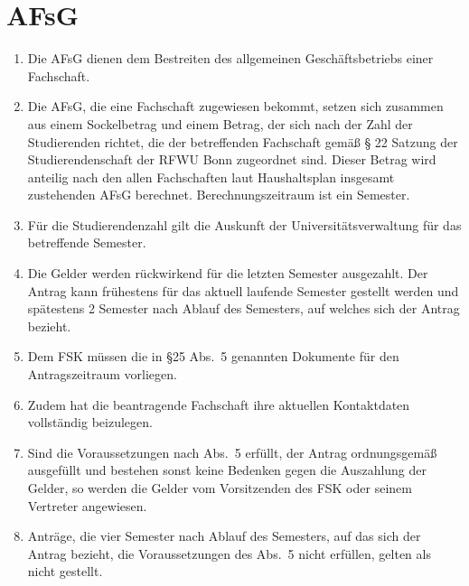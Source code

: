 \documentclass{article}
\begin{document}
\section{AFsG}
\begin{enumerate}[(1)]
    \item Die AFsG dienen dem Bestreiten des allgemeinen Geschäftsbetriebs einer Fachschaft.
    \item Die AFsG, die eine Fachschaft zugewiesen bekommt, setzen sich zusammen aus einem Sockelbetrag und einem Betrag, der sich nach der Zahl der Studierenden richtet, die der betreffenden Fachschaft gemäß § 22 Satzung der Studierendenschaft der RFWU Bonn zugeordnet sind. 
    	Dieser Betrag wird anteilig nach den allen Fachschaften laut Haushaltsplan insgesamt zustehenden AFsG berechnet. 
    	Berechnungszeitraum ist ein Semester.
    \item Für die Studierendenzahl gilt die Auskunft der Universitätsverwaltung für das betreffende Semester.
    \item Die Gelder werden rückwirkend für die letzten Semester ausgezahlt. 
    	Der Antrag kann frühestens für das aktuell laufende Semester gestellt werden und spätestens 2 Semester nach Ablauf des Semesters, auf welches sich der Antrag bezieht.
    \item Dem FSK müssen die in §25 Abs.\ 5 genannten Dokumente für den Antragszeitraum vorliegen.
    \item Zudem hat die beantragende Fachschaft ihre aktuellen Kontaktdaten vollständig beizulegen.
    \item Sind die Voraussetzungen nach Abs.\ 5 erfüllt, der Antrag ordnungsgemäß ausgefüllt und bestehen sonst keine Bedenken gegen die Auszahlung der Gelder, so werden die Gelder vom Vorsitzenden des FSK oder seinem Vertreter angewiesen.
    \item Anträge, die vier Semester nach Ablauf des Semesters, auf das sich der Antrag bezieht, die Voraussetzungen des Abs.\ 5 nicht erfüllen, gelten als nicht gestellt.
\end{enumerate}
\end{document}
